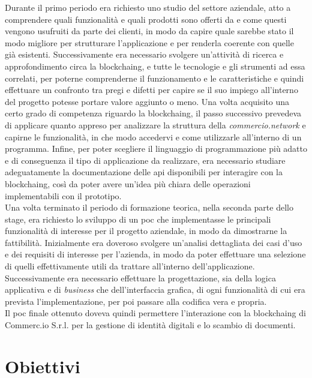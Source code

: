Durante il primo periodo era richiesto uno studio del settore aziendale, atto a comprendere quali funzionalità e quali prodotti sono offerti da \myCompany{} \companyTitle{} e come questi vengono usufruiti da parte dei clienti, in modo da capire quale sarebbe stato il modo migliore per strutturare l'applicazione e per renderla coerente con quelle già esistenti. Successivamente era necessario svolgere un'attività di ricerca e approfondimento circa la \gls{blockchaing}, e tutte le tecnologie e gli strumenti ad essa correlati, per poterne comprenderne il funzionamento e le caratteristiche e quindi effettuare un confronto tra pregi e difetti per capire se il suo impiego all'interno del progetto potesse portare valore aggiunto o meno. Una volta acquisito una certo grado di competenza riguardo la \gls{blockchaing}, il passo successivo prevedeva di applicare quanto appreso per analizzare la struttura della \textit{commercio.network} e capirne le funzionalità, in che modo accedervi e come utilizzarle all'interno di un programma. Infine, per poter scegliere il linguaggio di programmazione più adatto e di conseguenza il tipo di applicazione da realizzare, era necessario studiare adeguatamente la documentazione delle \gls{api} disponibili per interagire con la \gls{blockchaing}, così da poter avere un'idea più chiara delle operazioni implementabili con il prototipo.\\
Una volta terminato il periodo di formazione teorica, nella seconda parte dello stage, era richiesto lo sviluppo di un \gls{poc} che implementasse le principali funzionalità di interesse per il progetto aziendale, in modo da dimostrarne la fattibilità. Inizialmente era doveroso svolgere un'analisi dettagliata dei casi d'uso e dei requisiti di interesse per l'azienda, in modo da poter effettuare una selezione di quelli effettivamente utili da trattare all'interno dell'applicazione. Successivamente era necessario effettuare la progettazione, sia della logica applicativa e di \textit{business} che dell'interfaccia grafica, di ogni funzionalità di cui era prevista l'implementazione, per poi passare alla codifica vera e propria.\\
Il \gls{poc} finale ottenuto doveva quindi permettere l'interazione con la \gls{blockchaing} di Commerc.io S.r.l. per la gestione di identità digitali e lo scambio di documenti.

\section{Obiettivi}

